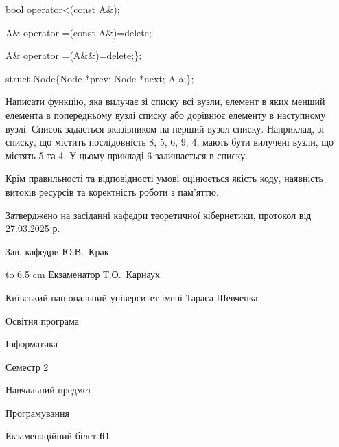 \documentclass[12pt, ukrainian]{article}
\begin{document}
{\quad  bool operator<(const A\&); 

\quad A\& operator =(const A\&)=delete; 

\quad  A\& operator =(A\&\&)=delete;\};

struct Node\{Node *prev; Node *next; A a;\};

Написати функцію, яка вилучає зі списку всі вузли, елемент в яких менший елемента в попередньому вузлі списку або дорівнює елементу в наступному вузлі. Список задається вказівником на перший вузол списку. Наприклад, зі списку, що містить послідовність 8, 5, 6, 9, 4, мають бути вилучені вузли, що містять 5 та 4. У цьому прикладі 6 залишається в списку.

Крім правильності та відповідності умові оцінюється якість коду, наявність витоків ресурсів та коректність роботи з пам'яттю. 

}
{\smallskip\smallskip \begin {scriptsize} Затверджено на засіданні кафедри теоретичної кібернетики, протокол   від   27.03.2025 р.\par\smallskip\smallskip\smallskip\smallskip
{\parbox {6.5 cm} {Зав. кафедри \dotfill Ю.В.~Крак}}\hspace {0.7cm} {\hbox to 6.5 cm { Екзаменатор \dotfill Т.О.~Карнаух}} \end{scriptsize}}
\newpage
{{\begin {scriptsize}\par
{ \center  Київський національний університет імені Тараса Шевченка \par}
{\parbox {5 cm}{Освітня програма \hfill}{\parbox {7 cm}{Інформатика\hfill}}\parbox {6 cm}{\hfill Семестр 2}}\par
{\parbox {5 cm} {Навчальний предмет \hfill}\parbox {7 cm}{Програмування \hfill}\parbox {6cm}{\hfill}\par}\vspace{-15pt} \end{scriptsize}}{\center Екзаменаційний білет \No \textbf { 61 }\par}}
\end{document}

